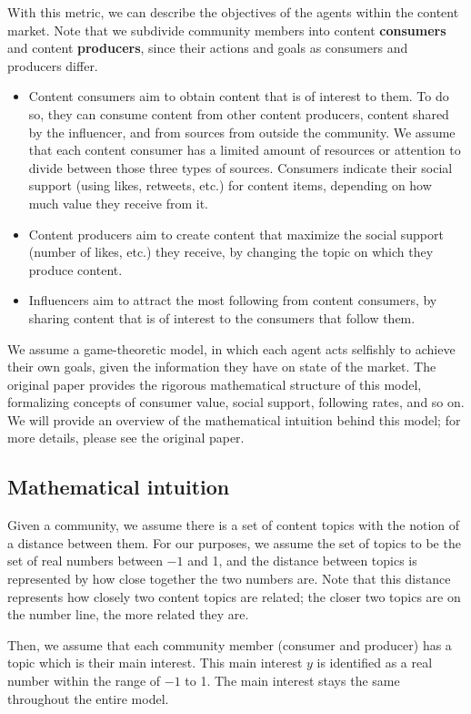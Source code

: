 \documentclass[11pt, letterpaper]{article}
\begin{document}
With this metric, we can describe the objectives of the agents within the content market. Note that we subdivide community members into content \textbf{consumers} and content \textbf{producers}, since their actions and goals as consumers and producers differ.
\begin{itemize}
    \item Content consumers aim to obtain content that is of interest to them. To do so, they can consume content from other content producers, content shared by the influencer, and from sources from outside the community. We assume that each content consumer has a limited amount of resources or attention to divide between those three types of sources. Consumers indicate their social support (using likes, retweets, etc.) for content items, depending on how much value they receive from it.
    \item Content producers aim to create content that maximize the social support (number of likes, etc.) they receive, by changing the topic on which they produce content.
    \item Influencers aim to attract the most following from content consumers, by sharing content that is of interest to the consumers that follow them. 
\end{itemize}
We assume a game-theoretic model, in which each agent acts selfishly to achieve their own goals, given the information they have on state of the market. The original paper provides the rigorous mathematical structure of this model, formalizing concepts of consumer value, social support, following rates, and so on. We will provide an overview of the mathematical intuition behind this model; for more details, please see the original paper.

\subsection{Mathematical intuition}

Given a community, we assume there is a set of content topics with the notion of a distance between them. For our purposes, we assume the set of topics to be the set of real numbers between \(-1\) and 1, and the distance between topics is represented by how close together the two numbers are. Note that this distance represents how closely two content topics are related; the closer two topics are on the number line, the more related they are.

Then, we assume that each community member (consumer and producer) has a topic which is their main interest. This main interest \(y\) is identified as a real number within the range of \(-1\) to 1. The main interest stays the same throughout the entire model.
\end{document}
